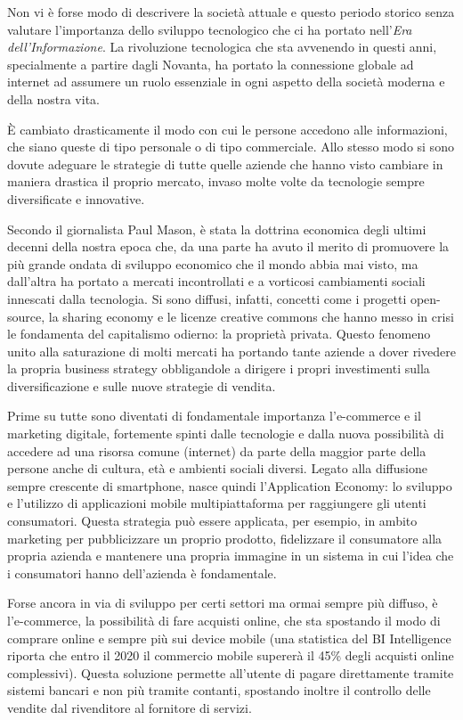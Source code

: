 Non vi è forse modo di descrivere la società attuale e questo periodo storico senza valutare l'importanza dello sviluppo tecnologico che ci ha portato nell'\textit{Era dell'Informazione}.
La rivoluzione tecnologica che sta avvenendo in questi anni, specialmente a partire dagli Novanta, ha portato la connessione globale ad internet ad assumere un ruolo essenziale in ogni aspetto della società moderna e della nostra vita.

È cambiato drasticamente il modo con cui le persone accedono alle informazioni, che siano queste di tipo personale o di tipo commerciale.
Allo stesso modo si sono dovute adeguare le strategie di tutte quelle aziende che hanno visto cambiare in maniera drastica il proprio mercato, invaso molte volte da tecnologie sempre diversificate e innovative.

Secondo il giornalista Paul Mason, è stata la dottrina economica degli ultimi decenni della nostra epoca che, da una parte ha avuto il merito di promuovere la più grande ondata di sviluppo economico che il mondo abbia mai visto, ma dall’altra ha portato a mercati incontrollati e a vorticosi cambiamenti sociali innescati dalla tecnologia.
Si sono diffusi, infatti, concetti come i progetti open-source, la sharing economy e le licenze creative commons che hanno messo in crisi le fondamenta del capitalismo odierno: la proprietà privata. 
Questo fenomeno unito alla saturazione di molti mercati ha portando tante aziende a dover rivedere la propria business strategy obbligandole a dirigere i propri investimenti sulla diversificazione e sulle nuove strategie di vendita. \autocite{POSTCAPITALISMO}

Prime su tutte sono diventati di fondamentale importanza l'e-commerce e il marketing digitale, fortemente spinti dalle tecnologie e dalla nuova possibilità di accedere ad una risorsa comune (internet) da parte della maggior parte della persone anche di cultura, età e ambienti sociali diversi.
Legato alla diffusione sempre crescente di smartphone, nasce quindi l'Application Economy: lo sviluppo e l'utilizzo di applicazioni mobile multipiattaforma per raggiungere gli utenti consumatori.
Questa strategia può essere applicata, per esempio, in ambito marketing per pubblicizzare un proprio prodotto, fidelizzare il consumatore alla propria azienda e mantenere una propria immagine in un sistema in cui l'idea che i consumatori hanno dell'azienda è fondamentale.

Forse ancora in via di sviluppo per certi settori ma ormai sempre più diffuso, è l'e-commerce, la possibilità di fare acquisti online, che sta spostando il modo di comprare online e sempre più sui device mobile (una statistica del BI Intelligence riporta che entro il 2020 il commercio mobile supererà il 45\% degli acquisti online complessivi).
Questa soluzione permette all'utente di pagare direttamente tramite sistemi bancari e non più tramite contanti, spostando inoltre il controllo delle vendite dal rivenditore al fornitore di servizi.

